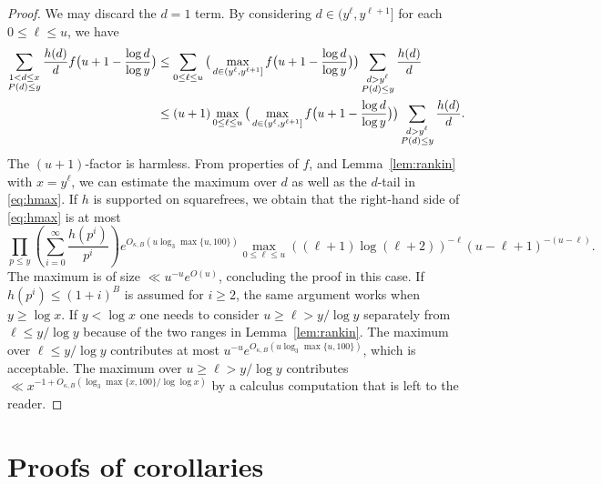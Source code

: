 \documentclass{article}
\theoremstyle{plain}
\theoremstyle{remark}
\numberwithin{equation}{section}
\begin{document}
\begin{proof}
We may discard the $d=1$ term. By considering $d\in (y^{\ell},y^{\ell+1}]$ for each $0\le \ell \le u$, we have
\begin{align}
\notag\sum_{\substack{1<d\le x\\ P(d)\le y}} \frac{h(d)}{d}f\big( u+1 - \frac{\log d}{\log y}\big) &\le \sum_{0\le \ell \le u} \big(\max_{d \in (y^{\ell},y^{\ell+1}]} f\big( u+1 - \frac{\log d}{\log y}\big)\big) \sum_{\substack{d>y^{\ell}\\ P(d)\le y}} \frac{h(d)}{d}\\
\label{eq:hmax}&\le (u+1) \max_{0\le \ell \le u} \big(\max_{d \in (y^{\ell},y^{\ell+1}]} f\big( u+1 - \frac{\log d}{\log y}\big)\big) \sum_{\substack{d>y^{\ell}\\ P(d)\le y}} \frac{h(d)}{d}. 
\end{align}
The $(u+1)$-factor is harmless. From properties of $f$, and Lemma~\ref{lem:rankin} with $x=y^{\ell}$, we can estimate the maximum over $d$ as well as the $d$-tail in \eqref{eq:hmax}. If $h$ is supported on squarefrees, we obtain that the right-hand side of \eqref{eq:hmax} is at most
\[  \prod_{p\le y}(\sum_{i=0}^{\infty}\frac{h(p^i)}{p^i}) e^{O_{\kappa,B}(u\log_3 \max\{u,100\})} \max_{0\le \ell \le u}((\ell+1)\log(\ell+2))^{-\ell}(u-\ell+1)^{-(u-\ell)}. \]
The maximum is of size $\ll u^{-u} e^{O(u)}$, concluding the proof in this case. If $h(p^i)\le (1+i)^B$ is assumed for $i\ge 2$, the same argument works when $y\ge \log x$. If $y<\log x$ one needs to consider $u\ge \ell > y/\log y$ separately from $\ell \le y/\log y$ because of the two ranges in Lemma~\ref{lem:rankin}. The maximum over $\ell\le y/\log y$ contributes at most $u^{-u}e^{O_{\kappa,B}(u\log_3 \max\{u,100\})}$, which is acceptable. The maximum over $u\ge \ell >y/\log y$ contributes $\ll x^{-1+O_{\kappa,B}(\log_3 \max\{x,100\} / \log \log x)}$ by a calculus computation that is left to the reader.
\end{proof}
\section{Proofs of corollaries}
\end{document}
